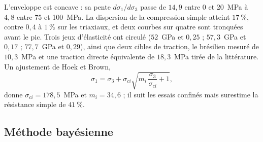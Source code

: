 L'enveloppe est concave : sa pente $d\sigma_1/d\sigma_3$ passe de $14{,}9$ entre 0 et 20~MPa à $4{,}8$ entre 75 et 100~MPa. La dispersion de la compression simple atteint $17~\%$, contre $0{,}4$ à $1~\%$ sur les triaxiaux, et deux courbes sur quatre sont tronquées avant le pic. Trois jeux d'élasticité ont circulé ($52$~GPa et $0{,}25$ ; $57{,}3$~GPa et $0{,}17$ ; $77{,}7$~GPa et $0{,}29$), ainsi que deux cibles de traction, le brésilien mesuré de $10{,}3$~MPa et une traction directe équivalente de $18{,}3$~MPa tirée de la littérature. Un ajustement de Hoek et Brown,
\begin{equation}
\sigma_1 = \sigma_3 + \sigma_{ci}\sqrt{m_i\,\frac{\sigma_3}{\sigma_{ci}} + 1},
\end{equation}
donne $\sigma_{ci} = 178{,}5$~MPa et $m_i = 34{,}6$ ; il suit les essais confinés mais surestime la résistance simple de $41~\%$.

\subsection{Méthode bayésienne}

